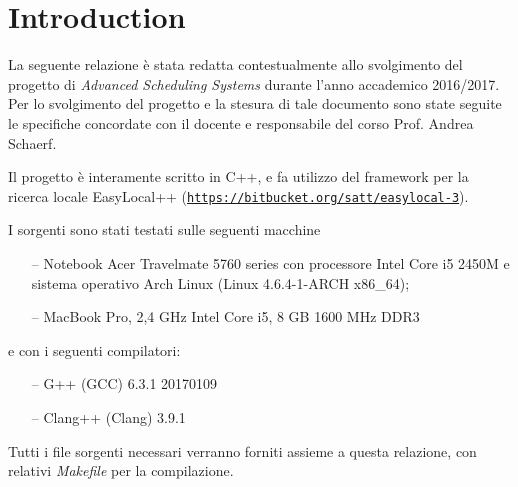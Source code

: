 
\section{Introduction} %
\label{sec:introduction}
    
    La seguente relazione è stata redatta contestualmente allo svolgimento del progetto di \emph{Advanced Scheduling Systems} durante l'anno accademico 2016/2017. Per lo svolgimento del progetto e la stesura di tale documento sono state seguite le specifiche concordate con il docente e responsabile del corso Prof. Andrea Schaerf.

    Il progetto è interamente scritto in C++, e fa utilizzo del framework per la ricerca locale EasyLocal++ (\href{https://bitbucket.org/satt/easylocal-3}{\texttt{https://bitbucket.org/satt/easylocal-3}}).

    I sorgenti sono stati testati sulle seguenti macchine
    \begin{itemize}
        \item[--] Notebook Acer Travelmate 5760 series con processore Intel Core i5 2450M e sistema operativo Arch Linux (Linux 4.6.4-1-ARCH x86\_64);
        \item[--] MacBook Pro, 2,4 GHz Intel Core i5, 8 GB 1600 MHz DDR3
    \end{itemize}
    e con i seguenti compilatori:
    \begin{itemize}
        \item[--] G++ (GCC) 6.3.1 20170109
        \item[--] Clang++ (Clang) 3.9.1
    \end{itemize}

    Tutti i file sorgenti necessari verranno forniti assieme a questa relazione, con relativi \emph{Makefile} per la compilazione. 

